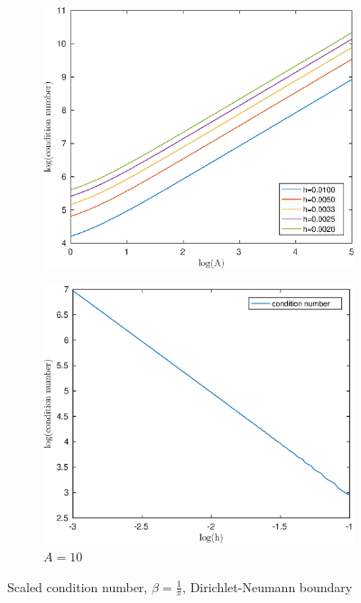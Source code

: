 \documentclass[12pt]{article}
\begin{document}
\begin{figure}[h!]
\centering
\begin{subfigure}{0.4\textwidth}
\includegraphics[width=\textwidth]{cond-A-pi-DN}
\caption{}
\end{subfigure}
\hfill
\begin{subfigure}{0.4\textwidth}
\includegraphics[width=\textwidth]{cond-N-pi-DN}
\caption{$A=10$}
\end{subfigure}
\caption{Scaled condition number, $\beta=\frac{1}{\pi}$, Dirichlet-Neumann boundary}
\end{figure}
\end{document}
